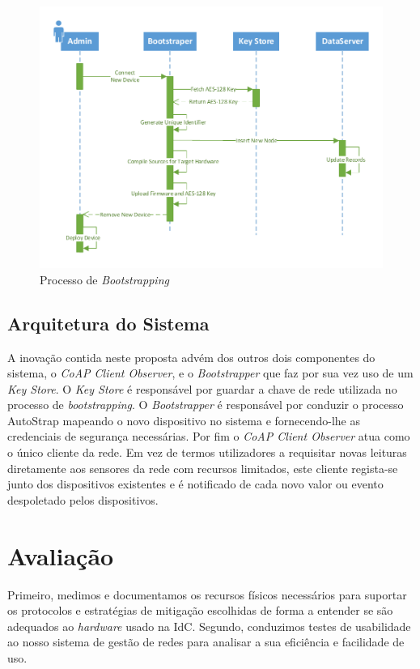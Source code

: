 \documentclass{llncs}
\begin{document}
\begin{figure}[h]
  \centering
  \includegraphics[width=0.95\linewidth]{figures/Sequence_Bootstrapping_Reviewed.pdf}
  \caption{Processo de \textit{Bootstrapping}}
  \label{fig:bootstrapping_process}
\end{figure}

\subsection{Arquitetura do Sistema}
\label{sec:system_architecture}
A inovação contida neste proposta advém dos outros dois componentes do sistema, o \textit{CoAP Client Observer}, e o \textit{Bootstrapper} que faz por sua vez uso de um \textit{Key Store}. 
O \textit{Key Store} é responsável por guardar a chave de rede utilizada no processo de \textit{bootstrapping}. 
O \textit{Bootstrapper} é responsável por conduzir o processo AutoStrap mapeando o novo dispositivo no sistema e fornecendo-lhe as credenciais de segurança necessárias. Por fim o \textit{CoAP Client Observer} atua como o único cliente da rede. Em vez de termos utilizadores a requisitar novas leituras diretamente aos sensores da rede com recursos limitados, este cliente regista-se junto dos dispositivos existentes e é notificado de cada novo valor ou evento despoletado pelos dispositivos. 

\section{Avaliação}
\label{sec:evaluation}
Primeiro, medimos e documentamos os recursos físicos necessários para suportar os protocolos e estratégias de mitigação escolhidas de forma a entender se são adequados ao \textit{hardware} usado na \ac{IdC}. Segundo, conduzimos testes de usabilidade ao nosso sistema de gestão de redes para analisar a sua eficiência e facilidade de uso.
\end{document}
